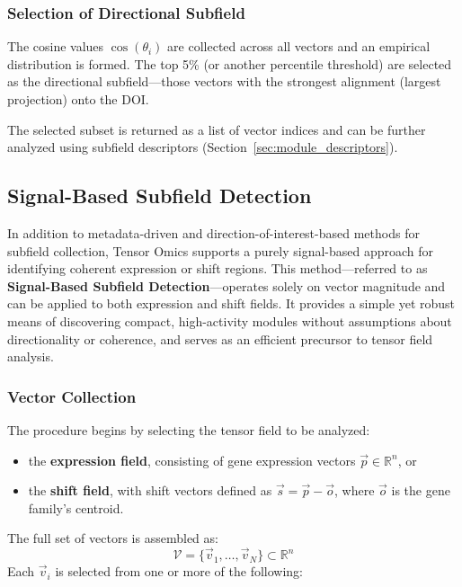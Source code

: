 \documentclass{article}
\begin{document}
\subsubsection{Selection of Directional Subfield}

The cosine values \( \cos(\theta_i) \) are collected across all vectors and an empirical distribution is formed. The top 5\% (or another percentile threshold) are selected as the directional subfield—those vectors with the strongest alignment (largest projection) onto the DOI.

The selected subset is returned as a list of vector indices and can be further analyzed using subfield descriptors (Section~\ref{sec:module_descriptors}).

\subsection{Signal-Based Subfield Detection}
\label{sec:signal_based_subfield_detection}

In addition to metadata-driven and direction-of-interest-based methods for subfield collection, Tensor Omics supports a purely signal-based approach for identifying coherent expression or shift regions. This method—referred to as \textbf{Signal-Based Subfield Detection}—operates solely on vector magnitude and can be applied to both expression and shift fields. It provides a simple yet robust means of discovering compact, high-activity modules without assumptions about directionality or coherence, and serves as an efficient precursor to tensor field analysis.

\subsubsection{Vector Collection}

The procedure begins by selecting the tensor field to be analyzed:

\begin{itemize}
    \item the \textbf{expression field}, consisting of gene expression vectors \( \vec{p} \in \mathbb{R}^n \), or
    \item the \textbf{shift field}, with shift vectors defined as \( \vec{s} = \vec{p} - \vec{o} \), where \( \vec{o} \) is the gene family's centroid.
\end{itemize}

The full set of vectors is assembled as:
\[
\mathcal{V} = \{ \vec{v}_1, \dots, \vec{v}_N \} \subset \mathbb{R}^n
\]
Each \( \vec{v}_i \) is selected from one or more of the following:
\end{document}
